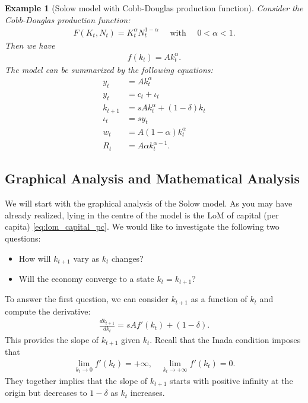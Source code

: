 \documentclass{book}
\newtheorem{example}{Example}[chapter]
\theoremstyle{definition}
\theoremstyle{plain}
\begin{document}
\begin{example}[Solow model with Cobb-Douglas production function]
    Consider the Cobb-Douglas production function:
    \begin{align*}
        F(K_t, N_t) = K_t^{\alpha} N_t^{1-\alpha} \quad \text{ with } \quad 0 < \alpha < 1.
    \end{align*}
    Then we have
    \begin{align*}
        f(k_t) = A k_t^{\alpha}.
    \end{align*}
    The model can be summarized by the following equations:
    \begin{align*}
        y_t &= A k_t^{\alpha} \\
        y_t &= c_t + \iota_t \\
        k_{t+1} & = s A k_t^{\alpha} + (1-\delta)k_t \\
        \iota_t &= s y_t \\
        w_t &= A (1-\alpha) k_t^{\alpha} \\
        R_t &= A \alpha k_t^{\alpha-1}.
    \end{align*}
\end{example}

\subsection{Graphical Analysis and Mathematical Analysis}
We will start with the graphical analysis of the Solow model. As you may have already realized, lying in the centre of the model is the LoM of capital (per capita) \eqref{eq:lom_capital_pc}. We would like to investigate the following two questions:
\begin{itemize}
    \item How will $k_{t+1}$ vary as $k_t$ changes?
    \item Will the economy converge to a state $k_t = k_{t+1}$?
\end{itemize}

To answer the first question, we can consider $k_{t+1}$ as a function of $k_t$ and compute the derivative:
\begin{align}\label{eq:d_kt1_d_kt}
    \frac{d k_{t+1}}{d k_t} = s A f'(k_t) + (1-\delta).
\end{align}
This provides the slope of $k_{t+1}$ given $k_t$. Recall that the Inada condition imposes that
\begin{align*}
    \lim_{k_t \to 0} f'(k_t) = +\infty, \quad \lim_{k_t \to +\infty} f'(k_t) = 0.
\end{align*}
They together implies that the slope of $k_{t+1}$ starts with positive infinity at the origin but decreases to $1-\delta$ as $k_t$ increases.
\end{document}
